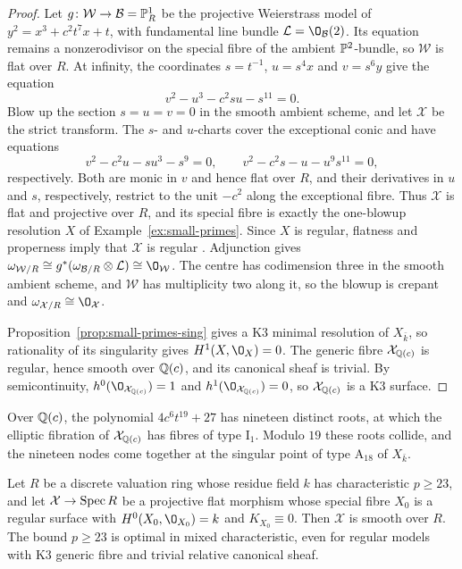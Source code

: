 \begin{proof}
Let $g\colon\mathcal W\to\mathcal B = \mathbb{P}^1_R$ be the projective Weierstrass model of $y^2 = x^3+c^2t^7x+t$, with fundamental line bundle $\mathcal L = \O_{\mathcal B}(2)$.
Its equation remains a nonzerodivisor on the special fibre of the ambient $\mathbb{P}^2$-bundle, so $\mathcal W$ is flat over $R$.
At infinity, the coordinates $s = t^{-1}$, $u = s^4x$ and $v = s^6y$ give the equation
\[
  v^2-u^3-c^2su-s^{11} = 0.
\]
Blow up the section $s = u = v = 0$ in the smooth ambient scheme, and let $\mathcal X$ be the strict transform.
The $s$- and $u$-charts cover the exceptional conic and have equations
\[
  v^2-c^2u-su^3-s^9 = 0,\qquad
  v^2-c^2s-u-u^9s^{11} = 0,
\]
respectively.
Both are monic in $v$ and hence flat over $R$, and their derivatives in $u$ and $s$, respectively, restrict to the unit $-c^2$ along the exceptional fibre.
Thus $\mathcal X$ is flat and projective over $R$, and its special fibre is exactly the one-blowup resolution $X$ of Example~\ref{ex:small-primes}.
Since $X$ is regular, flatness and properness imply that $\mathcal X$ is regular \cite[Tags~ and~]{Stacks}.
Adjunction gives $\omega_{\mathcal W/R}\cong g^*(\omega_{\mathcal B/R}\otimes\mathcal L)\cong\O_{\mathcal W}$.
The centre has codimension three in the smooth ambient scheme, and $\mathcal W$ has multiplicity two along it, so the blowup is crepant and $\omega_{\mathcal X/R}\cong\O_{\mathcal X}$.

Proposition~\ref{prop:small-primes-sing} gives a K3 minimal resolution of $X_{\bar k}$, so rationality of its singularity gives $H^1(X,\O_X) = 0$.
The generic fibre $\mathcal X_{\mathbb{Q}(c)}$ is regular, hence smooth over $\mathbb{Q}(c)$, and its canonical sheaf is trivial.
By semicontinuity, $h^0(\O_{\mathcal X_{\QQ(c)}}) = 1$ and $h^1(\O_{\mathcal X_{\QQ(c)}}) = 0$, so $\mathcal X_{\mathbb{Q}(c)}$ is a K3 surface.
\end{proof}

Over $\mathbb{Q}(c)$, the polynomial $4c^6t^{19}+27$ has nineteen distinct roots, at which the elliptic fibration of $\mathcal X_{\mathbb{Q}(c)}$ has fibres of type $\mathrm I_1$.
Modulo $19$ these roots collide, and the nineteen nodes come together at the singular point of type $\mathrm A_{18}$ of $X_{\bar k}$.

\begin{corollary}\label{cor:mixed-smooth}\label{rem:mixed-smooth}
Let $R$ be a discrete valuation ring whose residue field $k$ has characteristic $p\geq 23$, and let $\mathcal X\to\operatorname{Spec} R$ be a projective flat morphism whose special fibre $X_0$ is a regular surface with $H^0(X_0,\O_{X_0}) = k$ and $K_{X_0}\equiv 0$.
Then $\mathcal X$ is smooth over $R$.
The bound $p\geq 23$ is optimal in mixed characteristic, even for regular models with K3 generic fibre and trivial relative canonical sheaf.
\end{corollary}

